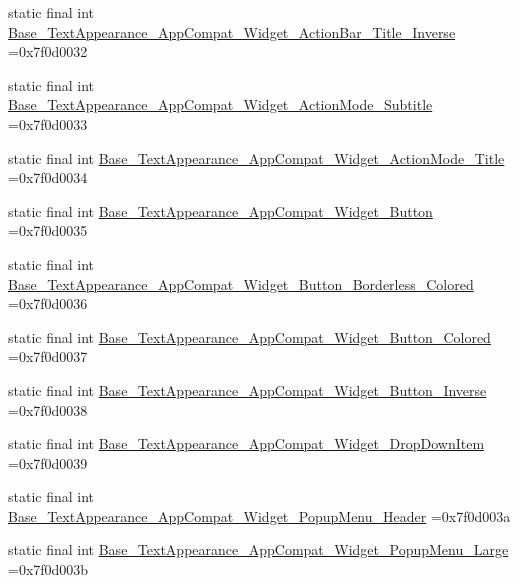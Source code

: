 \begin{DoxyCompactItemize}
\item 
static final int \mbox{\hyperlink{classbr_1_1unb_1_1cic_1_1mp_1_1marketmaster_1_1R_1_1style_ae65aa2494000ffc5cbfcf2b376fd0501}{Base\+\_\+\+Text\+Appearance\+\_\+\+App\+Compat\+\_\+\+Widget\+\_\+\+Action\+Bar\+\_\+\+Title\+\_\+\+Inverse}} =0x7f0d0032
\item 
static final int \mbox{\hyperlink{classbr_1_1unb_1_1cic_1_1mp_1_1marketmaster_1_1R_1_1style_a98384500d1382c67430a0f46aa410455}{Base\+\_\+\+Text\+Appearance\+\_\+\+App\+Compat\+\_\+\+Widget\+\_\+\+Action\+Mode\+\_\+\+Subtitle}} =0x7f0d0033
\item 
static final int \mbox{\hyperlink{classbr_1_1unb_1_1cic_1_1mp_1_1marketmaster_1_1R_1_1style_a409f73d56cac242ee0ff490c1c1004e6}{Base\+\_\+\+Text\+Appearance\+\_\+\+App\+Compat\+\_\+\+Widget\+\_\+\+Action\+Mode\+\_\+\+Title}} =0x7f0d0034
\item 
static final int \mbox{\hyperlink{classbr_1_1unb_1_1cic_1_1mp_1_1marketmaster_1_1R_1_1style_a86a319a6e154ac6d7da30fadf5ba2c99}{Base\+\_\+\+Text\+Appearance\+\_\+\+App\+Compat\+\_\+\+Widget\+\_\+\+Button}} =0x7f0d0035
\item 
static final int \mbox{\hyperlink{classbr_1_1unb_1_1cic_1_1mp_1_1marketmaster_1_1R_1_1style_a23d607299c63e1e24a501db7e57a0987}{Base\+\_\+\+Text\+Appearance\+\_\+\+App\+Compat\+\_\+\+Widget\+\_\+\+Button\+\_\+\+Borderless\+\_\+\+Colored}} =0x7f0d0036
\item 
static final int \mbox{\hyperlink{classbr_1_1unb_1_1cic_1_1mp_1_1marketmaster_1_1R_1_1style_aba7a2c164f6622d2f43f8d6e59aa07d5}{Base\+\_\+\+Text\+Appearance\+\_\+\+App\+Compat\+\_\+\+Widget\+\_\+\+Button\+\_\+\+Colored}} =0x7f0d0037
\item 
static final int \mbox{\hyperlink{classbr_1_1unb_1_1cic_1_1mp_1_1marketmaster_1_1R_1_1style_a8daab02480af18c4224e0f3452a315b0}{Base\+\_\+\+Text\+Appearance\+\_\+\+App\+Compat\+\_\+\+Widget\+\_\+\+Button\+\_\+\+Inverse}} =0x7f0d0038
\item 
static final int \mbox{\hyperlink{classbr_1_1unb_1_1cic_1_1mp_1_1marketmaster_1_1R_1_1style_a1aebfab77059125b50f98c328a738a8b}{Base\+\_\+\+Text\+Appearance\+\_\+\+App\+Compat\+\_\+\+Widget\+\_\+\+Drop\+Down\+Item}} =0x7f0d0039
\item 
static final int \mbox{\hyperlink{classbr_1_1unb_1_1cic_1_1mp_1_1marketmaster_1_1R_1_1style_a8c25268d90fcf595e8d8696b5e37968d}{Base\+\_\+\+Text\+Appearance\+\_\+\+App\+Compat\+\_\+\+Widget\+\_\+\+Popup\+Menu\+\_\+\+Header}} =0x7f0d003a
\item 
static final int \mbox{\hyperlink{classbr_1_1unb_1_1cic_1_1mp_1_1marketmaster_1_1R_1_1style_a8b32f153c2901e13fc31a9c5ae9a8aa2}{Base\+\_\+\+Text\+Appearance\+\_\+\+App\+Compat\+\_\+\+Widget\+\_\+\+Popup\+Menu\+\_\+\+Large}} =0x7f0d003b

\end{DoxyCompactItemize}
